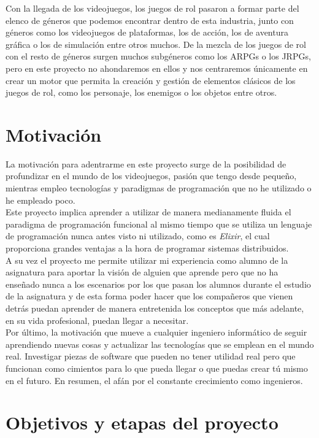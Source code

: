 Con la llegada de los videojuegos, los juegos de rol pasaron a formar parte del elenco de géneros que podemos encontrar dentro de esta industria, junto con géneros como los videojuegos de plataformas, los de acción, los de aventura gráfica o los de simulación entre otros muchos. De la mezcla de los juegos de rol con el resto de géneros surgen muchos subgéneros como los ARPGs o los JRPGs, pero en este proyecto no ahondaremos en ellos y nos centraremos únicamente en crear un motor que permita la creación y gestión de elementos clásicos de los juegos de rol, como los personaje, los enemigos o los objetos entre otros.

\section{Motivación}
La motivación para adentrarme en este proyecto surge de la posibilidad de profundizar en el mundo de los videojuegos, pasión que tengo desde pequeño, mientras empleo tecnologías y paradigmas de programación que no he utilizado o he empleado poco.
\\

Este proyecto implica aprender a utilizar de manera medianamente fluida el paradigma de programación funcional al mismo tiempo que se utiliza un lenguaje de programación nunca antes visto ni utilizado, como es \textit{Elixir}, el cual proporciona grandes ventajas a la hora de programar sistemas distribuidos.
\\

A su vez el proyecto me permite utilizar mi experiencia como alumno de la asignatura para aportar la visión de alguien que aprende pero que no ha enseñado nunca a los escenarios por los que pasan los alumnos durante el estudio de la asignatura y de esta forma poder hacer que los compañeros que vienen detrás puedan aprender de manera entretenida los conceptos que más adelante, en su vida profesional, puedan llegar a necesitar.
\\

Por último, la motivación que mueve a cualquier ingeniero informático de seguir aprendiendo nuevas cosas y actualizar las tecnologías que se emplean en el mundo real. Investigar piezas de software que pueden no tener utilidad real pero que funcionan como cimientos para lo que pueda llegar o que puedas crear tú mismo en el futuro. En resumen, el afán por el constante crecimiento como ingenieros.

\section{Objetivos y etapas del proyecto}
